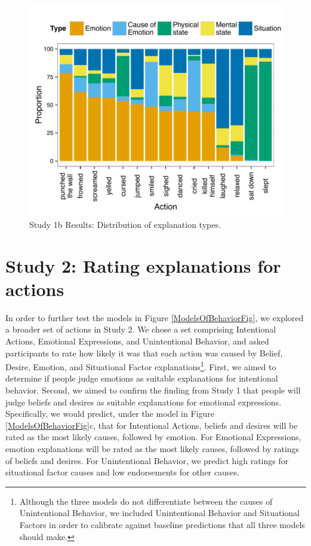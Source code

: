 \documentclass[10pt,letterpaper]{article}
\begin{document}
\begin{figure}[thb]
\begin{center}\includegraphics[width=1.0\columnwidth]{images/study1b_codePlot.pdf}\end{center}
\caption{ Study 1b Results: Distribution of explanation types. }
\label{Study1bResultsFig}
\end{figure}






\section{Study 2: Rating explanations for actions}


In order to further test the models in Figure \ref{ModelsOfBehaviorFig}, we explored a broader set of actions in Study 2. 
We chose a set comprising Intentional Actions, Emotional Expressions, and Unintentional Behavior, and asked participants to rate how likely it was that each action was caused by Belief, Desire, Emotion, and Situational Factor explanations\footnote{Although the three models do not differentiate between the causes of Unintentional Behavior, we included Unintentional Behavior and Situational Factors in order to calibrate against baseline predictions that all three models should make.
}. First, we aimed to determine if people judge emotions as suitable explanations for intentional behavior. Second, we aimed to confirm the finding from Study 1 that people will judge beliefs and desires as suitable explanations for emotional expressions. 
Specifically, we would predict, under the model in Figure \ref{ModelsOfBehaviorFig}c, that for Intentional Actions, beliefs and desires will be rated as the most likely causes, followed by emotion. 
For Emotional Expressions, emotion explanations will be rated as the most likely causes, followed by ratings of beliefs and desires. 
For Unintentional Behavior, we predict high ratings for situational factor causes and low endorsements for other causes.
\end{document}
